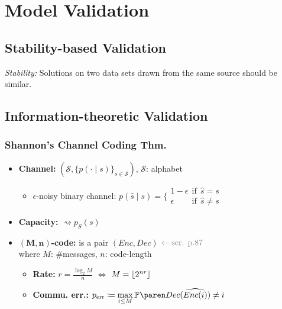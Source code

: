 \columnbreak
\section{Model Validation}

\subsection{Stability-based Validation}

\emph{Stability:}\enspace
Solutions on two data sets drawn from the same source should be similar.


\subsection{Information-theoretic Validation}

\subsubsection{Shannon's Channel Coding Thm.}

\begin{itemize}
    \item \textbf{Channel:}\enspace
        $(\mathcal S, \{p(\cdot\mid s)\}_{s\in\mathcal S} )$,\enspace
        $\mathcal S$: alphabet
        \begin{itemize}
            \item $\epsilon$-noisy binary channel:
                $p(\hat s\mid s) = \big\{ \substack{
                    1-\epsilon \:\:\text{if}\:\: \hat s=s \\
                    \epsilon \phantom{1-} \:\:\text{if}\:\: \hat s\neq s}$
        \end{itemize}
        \vspace{-3pt}
    \item \textbf{Capacity:}\enspace
        $\rightsquigarrow p_S(s)$
    \item \textbf{$\bm{(M,n)}$-code:}\enspace
        is a pair $(Enc,Dec)$\hfill
        $\color{gray} \leftarrow\text{scr. p.87}$\\\quad
        where $M$: \#messages, $n$: code-length
        \begin{itemize}
            \item \textbf{Rate:}\enspace
                $r = \frac{\log_2 M}{n}$
                $\Leftrightarrow$ $M=\lfloor2^{nr}\rfloor$
            \item \textbf{Commu. err.:}\enspace
                $p\ped{err} \coloneqq \max\limits_{i\leq M}
                \P{ Dec(\widehat{ Enc(i) }) \neq i }$
        \end{itemize}
\end{itemize}

